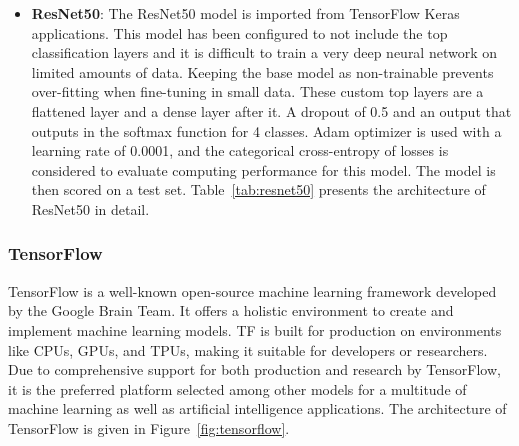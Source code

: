 \documentclass{ijcaArticle}
\begin{document}
\begin{itemize}
    \item \textbf{ResNet50}: The ResNet50 model is imported from TensorFlow Keras applications. This model has been configured to not include the top classification layers and it is difficult to train a very deep neural network on limited amounts of data. Keeping the base model as non-trainable prevents over-fitting when fine-tuning in small data. These custom top layers are a flattened layer and a dense layer after it. A dropout of 0.5 and an output that outputs in the softmax function for 4 classes. Adam optimizer is used with a learning rate of 0.0001, and the categorical cross-entropy of losses is considered to evaluate computing performance for this model. The model is then scored on a test set. Table~\ref{tab:resnet50} presents the architecture of ResNet50 in detail.

\begin{table}[htbp]
\label{tab:resnet50}
\end{table}

\end{itemize}

\subsubsection{TensorFlow}
TensorFlow is a well-known open-source machine learning framework developed by the Google Brain Team. It offers a holistic environment to create and implement machine learning models. TF is built for production on environments like CPUs, GPUs, and TPUs, making it suitable for developers or researchers. Due to comprehensive support for both production and research by TensorFlow, it is the preferred platform selected among other models for a multitude of machine learning as well as artificial intelligence applications. The architecture of TensorFlow is given in Figure~\ref{fig:tensorflow}.
\end{document}
